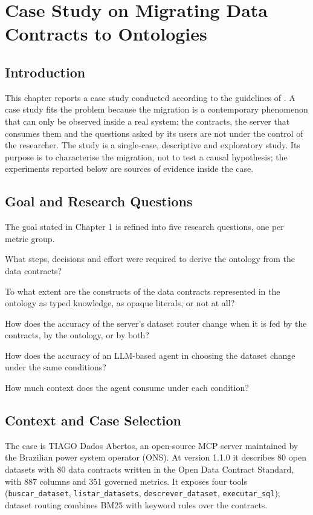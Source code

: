\chapter{Case Study on Migrating Data Contracts to Ontologies}
\label{ch:case}

\section{Introduction}
This chapter reports a case study conducted according to the guidelines of
. A case study fits the problem because the migration is a
contemporary phenomenon that can only be observed inside a real system: the contracts, the
server that consumes them and the questions asked by its users are not under the control of
the researcher. The study is a single-case, descriptive and exploratory study. Its purpose
is to characterise the migration, not to test a causal hypothesis; the experiments reported
below are sources of evidence inside the case.

\section{Goal and Research Questions}
\label{sec:goal-rqs}
The goal stated in Chapter 1 is refined into five research questions, one per metric group.
\begin{description}[leftmargin=1cm]
\item[RQ1 (Effort)] What steps, decisions and effort were required to derive the ontology from the data contracts?
\item[RQ2 (Fidelity)] To what extent are the constructs of the data contracts represented in the ontology as typed knowledge, as opaque literals, or not at all?
\item[RQ3 (Routing effectiveness)] How does the accuracy of the server's dataset router change when it is fed by the contracts, by the ontology, or by both?
\item[RQ4 (Agent effectiveness)] How does the accuracy of an LLM-based agent in choosing the dataset change under the same conditions?
\item[RQ5 (Cost)] How much context does the agent consume under each condition?
\end{description}

\section{Context and Case Selection}
The case is TIAGO Dados Abertos, an open-source MCP server maintained by the Brazilian
power system operator (ONS). At version 1.1.0 it describes 80 open datasets with 80 data
contracts written in the Open Data Contract Standard, with 887 columns and 351 governed
metrics. It exposes four tools (\texttt{buscar\_dataset}, \texttt{listar\_datasets},
\texttt{descrever\_dataset}, \texttt{executar\_sql}); dataset routing combines BM25 with
keyword rules over the contracts.

